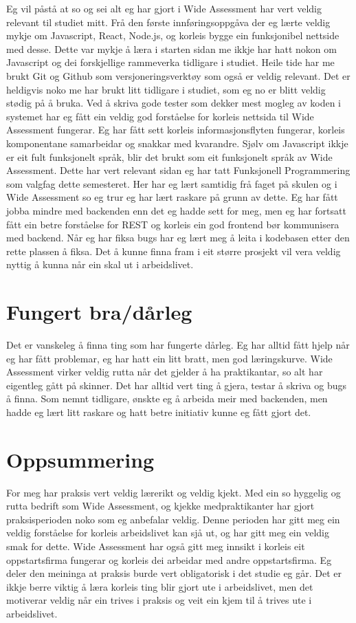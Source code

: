 \documentclass[12pt]{article}
\begin{document}
Eg vil påstå at so og sei alt eg har gjort i Wide Assessment har vert veldig relevant
til studiet mitt. Frå den første innføringsoppgåva der eg lærte veldig mykje om
Javascript, React, Node.js, og korleis bygge ein funksjonibel nettside med desse.
Dette var mykje å læra i starten sidan me ikkje har hatt nokon om Javascript og
dei forskjellige rammeverka tidligare i studiet.
Heile tide har me brukt Git og Github som versjoneringsverktøy som også er veldig
relevant. Det er heldigvis noko me har brukt litt tidligare i studiet, som eg no
er blitt veldig stødig på å bruka.
Ved å skriva gode tester som dekker mest mogleg av koden i systemet
har eg fått ein veldig god forståelse for korleis nettsida til Wide Assessment
fungerar. Eg har fått sett korleis informasjonsflyten fungerar, korleis
komponentane samarbeidar og snakkar med kvarandre. Sjølv om Javascript ikkje er
eit fult funksjonelt språk, blir det brukt som eit funksjonelt språk av Wide Assessment.
Dette har vert relevant sidan eg har tatt Funksjonell Programmering som valgfag
dette semesteret. Her har eg lært samtidig frå faget på skulen og i Wide Assessment
so eg trur eg har lært raskare på grunn av dette.
Eg har fått jobba mindre med backenden enn det eg hadde sett for meg, men eg har
fortsatt fått ein betre forståelse for REST og korleis ein god frontend bør
kommunisera med backend. Når eg har fiksa bugs har eg lært meg å leita i
kodebasen etter den rette plassen å fiksa. Det å kunne finna fram i eit større
prosjekt vil vera veldig nyttig å kunna når ein skal ut i arbeidslivet.

\section{Fungert bra/dårleg}

Det er vanskeleg å finna ting som har fungerte dårleg. Eg har alltid fått hjelp
når eg har fått problemar, eg har hatt ein litt bratt, men god læringskurve.
Wide Assessment virker veldig rutta når det gjelder å ha praktikantar, so alt
har eigentleg gått på skinner. Det har alltid vert ting å gjera, testar å skriva
og bugs å finna. Som nemnt tidligare, ønskte eg å arbeida meir med
backenden, men hadde eg lært litt raskare og hatt betre initiativ kunne eg fått
gjort det.

\section{Oppsummering}

For meg har praksis vert veldig lærerikt og veldig kjekt. Med ein so hyggelig og
rutta bedrift som Wide Assessment, og kjekke medpraktikanter har gjort praksisperioden
noko som eg anbefalar veldig. Denne perioden har gitt meg ein veldig forståelse
for korleis arbeidslivet kan sjå ut, og har gitt meg ein veldig smak for dette.
Wide Assessment har også gitt meg innsikt i korleis eit oppstartsfirma fungerar
og korleis dei arbeidar med andre oppstartsfirma. Eg deler den meininga at praksis
burde vert obligatorisk i det studie eg går. Det er ikkje berre viktig å læra
korleis ting blir gjort ute i arbeidslivet, men det motiverar veldig når ein
trives i praksis og veit ein kjem til å trives ute i arbeidslivet.
\end{document}

